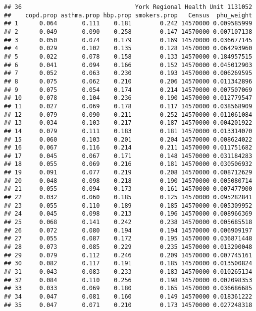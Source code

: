 \documentclass[]{article}
\begin{document}
\begin{verbatim}
## 36                                York Regional Health Unit 1131052
##    copd.prop asthma.prop hbp.prop smokers.prop   Census  phu_weight
## 1      0.064       0.111    0.181        0.242 14570000 0.009585999
## 2      0.049       0.090    0.258        0.147 14570000 0.007107138
## 3      0.050       0.074    0.179        0.169 14570000 0.036677145
## 4      0.029       0.102    0.135        0.128 14570000 0.064293960
## 5      0.022       0.078    0.158        0.133 14570000 0.184957515
## 6      0.041       0.094    0.166        0.152 14570000 0.045012903
## 7      0.052       0.063    0.230        0.193 14570000 0.006269595
## 8      0.075       0.062    0.210        0.206 14570000 0.011342896
## 9      0.075       0.054    0.174        0.214 14570000 0.007507069
## 10     0.078       0.104    0.236        0.190 14570000 0.012779547
## 11     0.027       0.069    0.178        0.117 14570000 0.038568909
## 12     0.079       0.090    0.211        0.252 14570000 0.011061084
## 13     0.034       0.103    0.217        0.187 14570000 0.004201922
## 14     0.079       0.111    0.183        0.181 14570000 0.013314070
## 15     0.060       0.103    0.201        0.204 14570000 0.008624022
## 16     0.067       0.116    0.214        0.211 14570000 0.011751682
## 17     0.045       0.067    0.171        0.148 14570000 0.031184283
## 18     0.055       0.069    0.216        0.181 14570000 0.030506932
## 19     0.091       0.077    0.219        0.208 14570000 0.008712629
## 20     0.048       0.098    0.218        0.190 14570000 0.005080714
## 21     0.055       0.094    0.173        0.161 14570000 0.007477900
## 22     0.032       0.060    0.185        0.125 14570000 0.095282841
## 23     0.055       0.110    0.189        0.185 14570000 0.005309952
## 24     0.045       0.098    0.213        0.196 14570000 0.008966369
## 25     0.068       0.141    0.242        0.238 14570000 0.005685518
## 26     0.072       0.080    0.194        0.194 14570000 0.006909197
## 27     0.055       0.087    0.172        0.195 14570000 0.036871448
## 28     0.073       0.085    0.229        0.235 14570000 0.013290048
## 29     0.079       0.112    0.246        0.209 14570000 0.007745161
## 30     0.082       0.117    0.191        0.185 14570000 0.013500824
## 31     0.043       0.083    0.233        0.183 14570000 0.010265134
## 32     0.084       0.110    0.256        0.198 14570000 0.002098353
## 33     0.033       0.069    0.180        0.165 14570000 0.036686685
## 34     0.047       0.081    0.160        0.149 14570000 0.018361222
## 35     0.047       0.071    0.210        0.173 14570000 0.027248318

\end{verbatim}
\end{document}
